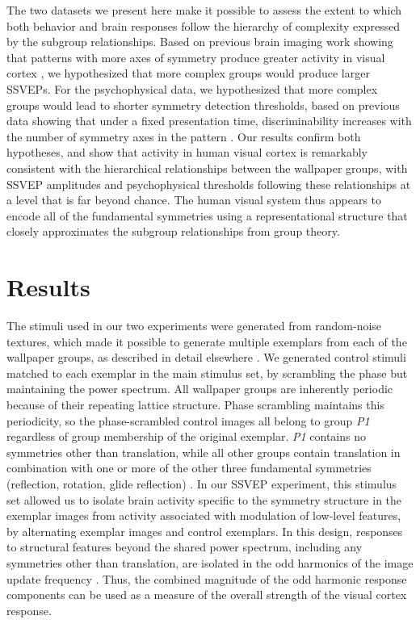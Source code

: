 \documentclass[11pt, twoside]{article}
\begin{document}
The two datasets we present here make it possible to assess the extent to which both behavior and brain responses follow the hierarchy of complexity expressed by the subgroup relationships. Based on previous brain imaging work showing that patterns with more axes of symmetry produce greater activity in visual cortex \citep{Sasaki_2005, Tyler_2005,RN1959, RN1725, keefe_2018}, we hypothesized that more complex groups would produce larger SSVEPs. For the psychophysical data, we hypothesized that more complex groups would lead to shorter symmetry detection thresholds, based on previous data showing that under a fixed presentation time, discriminability increases with the number of symmetry axes in the pattern \citep{wagemans_1991}. Our results confirm both hypotheses, and show that activity in human visual cortex is remarkably consistent with the hierarchical relationships between the wallpaper groups, with SSVEP amplitudes and psychophysical thresholds following these relationships at a level that is far beyond chance. The human visual system thus appears to encode all of the fundamental symmetries using a representational structure that closely approximates the subgroup relationships from group theory.

\section*{Results}

The stimuli used in our two experiments were generated from random-noise textures, which made it possible to generate multiple exemplars from each of the wallpaper groups, as described in detail elsewhere \citep{RN1725}. We generated control stimuli matched to each exemplar in the main stimulus set, by scrambling the phase but maintaining the power spectrum. All wallpaper groups are inherently periodic because of their repeating lattice structure. Phase scrambling maintains this periodicity, so the phase-scrambled control images all belong to group \textit{P1} regardless of group membership of the original exemplar. \textit{P1} contains no symmetries other than translation, while all other groups contain translation in combination with one or more of the other three fundamental symmetries (reflection, rotation, glide reflection) \citep{RN1425}. In our SSVEP experiment, this stimulus set allowed us to isolate brain activity specific to the symmetry structure in the exemplar images from activity associated with modulation of low-level features, by alternating exemplar images and control exemplars. In this design, responses to structural features beyond the shared power spectrum, including any symmetries other than translation, are isolated in the odd harmonics of the image update frequency \citep{RN1725,RN1540, RN1954}. Thus, the combined magnitude of the odd harmonic response components can be used as a measure of the overall strength of the visual cortex response.
\end{document}
